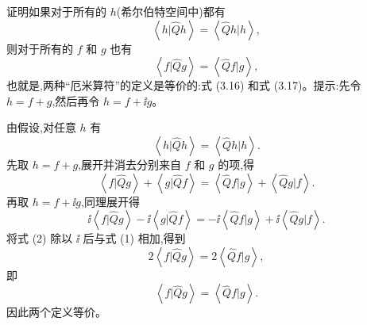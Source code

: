 \begin{question}
证明如果对于所有的 $h$(希尔伯特空间中)都有
\[
\left\langle h|\hat Q h \right\rangle=\left\langle \hat Q h|h \right\rangle,
\]
则对于所有的 $f$ 和 $g$ 也有
\[
\left\langle f|\hat Q g \right\rangle=\left\langle \hat Q f|g \right\rangle,
\]
也就是,两种“厄米算符”的定义是等价的:式 (3.16) 和式 (3.17)。提示:先令 $h=f+g$,然后再令 $h=f+\ii g$。

\par\smallskip
{}

\end{question}
\begin{solution}
由假设,对任意 $h$ 有
\[
\left\langle h|\hat Qh \right\rangle=\left\langle \hat Qh|h \right\rangle.
\]
先取 $h=f+g$,展开并消去分别来自 $f$ 和 $g$ 的项,得
\[
\left\langle f|\hat Q g \right\rangle+\left\langle g|\hat Q f \right\rangle
=\left\langle \hat Q f|g \right\rangle+\left\langle \hat Q g|f \right\rangle.\tag{1}
\]
再取 $h=f+\ii g$,同理展开得
\[
\ii\left\langle f|\hat Q g \right\rangle-\ii\left\langle g|\hat Q f \right\rangle
=-\ii\left\langle \hat Q f|g \right\rangle+\ii\left\langle \hat Q g|f \right\rangle.\tag{2}
\]
将式 (2) 除以 $\ii$ 后与式 (1) 相加,得到
\[
2\left\langle f|\hat Qg \right\rangle=2\left\langle \hat Q f|g \right\rangle,
\]
即
\[
\boxed{\left\langle f|\hat Qg \right\rangle=\left\langle \hat Q f|g \right\rangle}.
\]
因此两个定义等价。
\end{solution}

